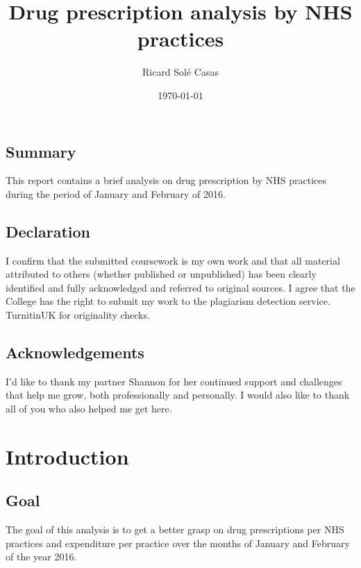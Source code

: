 \documentclass[english,a4paper,]{report}
\title{Drug prescription analysis by NHS practices}
\author{Ricard Solé Casas}
\institute{Google UK \and Ada National College for Digital Skills}
\date{\today}
\begin{document}
\maketitle

\vspace*{\fill}

\section*{Summary}

This report contains a brief analysis on drug prescription by NHS
practices during the period of January and February of 2016.

\section*{Declaration}

I confirm that the submitted coursework is my own work and that all
material attributed to others (whether published or unpublished) has
been clearly identified and fully acknowledged and referred to original
sources. I agree that the College has the right to submit my work to the
plagiarism detection service. TurnitinUK for originality checks.

\section*{Acknowledgements}

I'd like to thank my partner Shannon for her continued support and
challenges that help me grow, both professionally and personally. I
would also like to thank all of you who also helped me get here.

\vspace*{\fill}

{
\setcounter{tocdepth}{2}
\tableofcontents
}
\chapter{Introduction}\label{introduction}

\section{Goal}\label{goal}

The goal of this analysis is to get a better grasp on drug prescriptions
per NHS practices and expenditure per practice over the months of
January and February of the year 2016.
\end{document}
